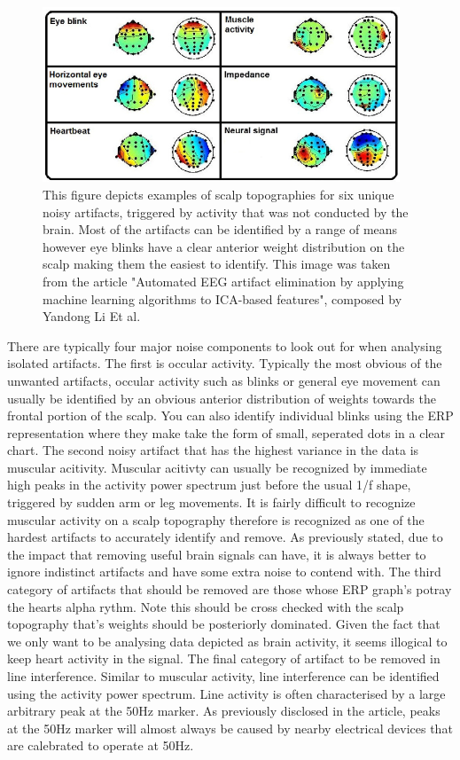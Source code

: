 \documentclass[11pt]{article}
\begin{document}
 \begin{figure}[tb]
\centering
\includegraphics[width=0.95\textwidth]{Noise.png}
\caption{\label{fig:Noise}
This figure depicts examples of scalp topographies for six unique noisy artifacts, triggered by activity that was not conducted by the brain. Most of the artifacts can be identified by a range of  means however eye blinks have a clear anterior weight distribution on the scalp making them the easiest to identify. This image was taken from the article "Automated EEG artifact elimination by applying machine learning algorithms to ICA-based features", composed by Yandong Li Et al. \cite{Li2017AutomatedEA}}
\end{figure} 

There are typically four major noise components to look out for when analysing isolated artifacts. The first is occular activity. Typically the most obvious of the unwanted artifacts, occular activity such as blinks or general eye movement can usually be identified by an obvious anterior distribution of weights towards the frontal portion of the scalp. You can also identify individual blinks using the ERP representation where they make take the form of small, seperated dots in a clear chart. The second noisy artifact that has the highest variance in the data is muscular acitivity. Muscular acitivty can usually be recognized by immediate high peaks in the activity power spectrum just before the usual 1/f shape, triggered by sudden arm or leg movements. It is fairly difficult to recognize muscular activity on a scalp topography therefore is recognized as one of the hardest artifacts to accurately identify and remove. As previously stated, due to the impact that removing useful brain signals can have, it is always better to ignore indistinct artifacts and have some extra noise to contend with. The third category of artifacts that should be removed are those whose ERP graph's potray the hearts alpha rythm. Note this should be cross checked with the scalp topography that's weights should be posteriorly dominated. Given the fact that we only want to be analysing data depicted as brain activity, it seems illogical to keep heart activity in the signal. The final category of artifact to be removed in line interference. Similar to muscular activity, line interference can be identified using the activity power spectrum. Line activity is often characterised by a large arbitrary peak at the 50Hz marker. As previously disclosed in the article, peaks at the 50Hz marker will almost always be caused by nearby electrical devices that are calebrated to operate at 50Hz.
\end{document}
